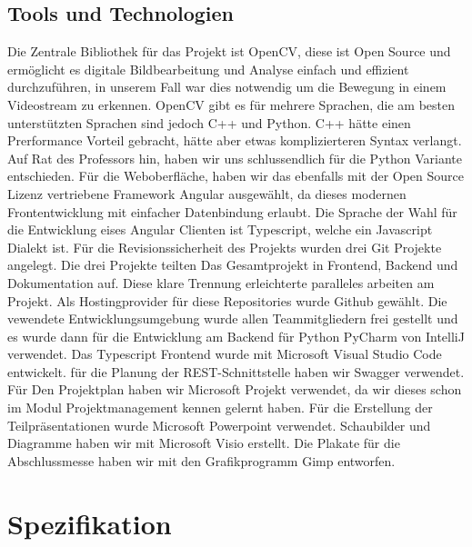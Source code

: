 \subsection{Tools und Technologien}
Die Zentrale Bibliothek für das Projekt ist OpenCV, diese ist Open Source und ermöglicht es digitale Bildbearbeitung und Analyse einfach und effizient durchzuführen, in unserem Fall war dies notwendig um die Bewegung in einem Videostream zu erkennen. \newline
OpenCV gibt es für mehrere Sprachen, die am besten unterstützten Sprachen sind jedoch C++ und Python. C++ hätte einen Prerformance Vorteil gebracht, hätte aber etwas komplizierteren Syntax verlangt. Auf Rat des Professors hin, haben wir uns  schlussendlich für die Python Variante entschieden. \newline
Für die Weboberfläche, haben wir das ebenfalls mit der Open Source Lizenz vertriebene Framework Angular ausgewählt, da dieses modernen Frontentwicklung mit einfacher Datenbindung erlaubt.\newline
Die Sprache der Wahl für die Entwicklung eises Angular Clienten ist Typescript, welche ein Javascript Dialekt ist.\newline
Für die Revisionssicherheit des Projekts wurden drei Git Projekte angelegt.
Die drei Projekte teilten Das Gesamtprojekt in Frontend, Backend und Dokumentation auf. Diese klare Trennung erleichterte paralleles arbeiten am Projekt. Als Hostingprovider für diese Repositories wurde Github gewählt.\newline
Die vewendete Entwicklungsumgebung wurde allen Teammitgliedern frei gestellt und es wurde dann für die Entwicklung am Backend für Python PyCharm von IntelliJ verwendet. Das Typescript Frontend wurde mit Microsoft Visual Studio Code entwickelt.\newline
für die Planung der REST-Schnittstelle haben wir Swagger verwendet.\newline
Für Den Projektplan haben wir Microsoft Projekt verwendet, da wir dieses schon im  Modul Projektmanagement kennen gelernt haben.\newline
Für die Erstellung der Teilpräsentationen wurde Microsoft Powerpoint verwendet.\newline
Schaubilder und Diagramme haben wir mit Microsoft Visio erstellt.\newline
Die Plakate für die Abschlussmesse haben wir mit den Grafikprogramm Gimp entworfen.\newline

\section{Spezifikation}
